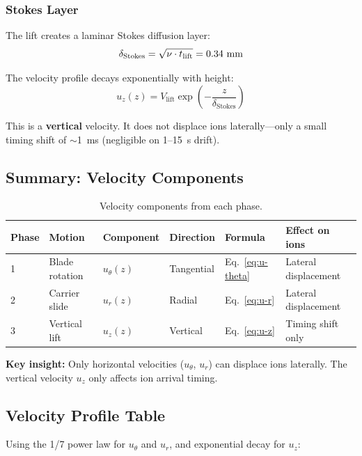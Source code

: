 \documentclass[11pt,a4paper]{article}
\begin{document}
\subsubsection{Stokes Layer}

The lift creates a laminar Stokes diffusion layer:
\begin{equation}
  \delta_\mathrm{Stokes} = \sqrt{\nu \cdot t_\mathrm{lift}} = 0.34~\text{mm}
\end{equation}

The velocity profile decays exponentially with height:
\begin{equation}
  \boxed{u_z(z) = V_\mathrm{lift} \exp\left(-\frac{z}{\delta_\mathrm{Stokes}}\right)}
  \label{eq:u-z}
\end{equation}

This is a \textbf{vertical} velocity. It does not displace ions laterally---only
a small timing shift of $\sim$1~ms (negligible on 1--15~s drift).

\subsection{Summary: Velocity Components}

\begin{table}[H]
\centering
\caption{Velocity components from each phase.}
\begin{tabular}{llllll}
\toprule
Phase & Motion & Component & Direction & Formula & Effect on ions \\
\midrule
1 & Blade rotation & $u_\theta(z)$ & Tangential & Eq.~\eqref{eq:u-theta} & Lateral displacement \\
2 & Carrier slide & $u_r(z)$ & Radial & Eq.~\eqref{eq:u-r} & Lateral displacement \\
3 & Vertical lift & $u_z(z)$ & Vertical & Eq.~\eqref{eq:u-z} & Timing shift only \\
\bottomrule
\end{tabular}
\end{table}

\textbf{Key insight:} Only horizontal velocities ($u_\theta$, $u_r$) can displace
ions laterally. The vertical velocity $u_z$ only affects ion arrival timing.

\subsection{Velocity Profile Table}

Using the 1/7 power law for $u_\theta$ and $u_r$, and exponential decay for $u_z$:
\end{document}
